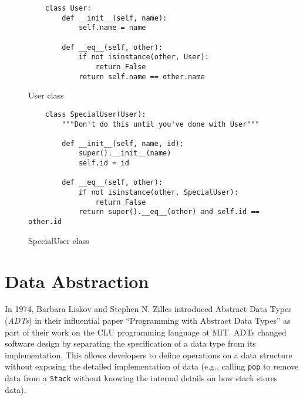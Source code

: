 \documentclass[oneside,11pt,dvipsnames]{book}
\newcommand{\code}[1]{\texttt{#1}}
\begin{document}
    

\begin{figure}
\begin{lstlisting}
    class User:
        def __init__(self, name):
            self.name = name

        def __eq__(self, other):
            if not isinstance(other, User):
                return False
            return self.name == other.name
\end{lstlisting}
\caption{User class}\label{ex:user}
\end{figure}


\begin{figure}
\begin{lstlisting}
    class SpecialUser(User):
        """Don't do this until you've done with User"""

        def __init__(self, name, id):
            super().__init__(name)
            self.id = id

        def __eq__(self, other):
            if not isinstance(other, SpecialUser):
                return False
            return super().__eq__(other) and self.id == other.id
\end{lstlisting}
\caption{SpecialUser class}\label{ex:specialuser}
\end{figure}




\chapter{Data Abstraction}\label{chap:adt}


In 1974, Barbara Liskov and Stephen N. Zilles introduced Abstract Data Types (\emph{ADTs}) in their influential paper ``Programming with Abstract Data Types'' as part of their work on the CLU programming language at MIT. ADTs changed software design by separating the specification of a data type from its implementation. This allows developers to define operations on a data structure without exposing the detailed implementation of data (e.g., calling \code{pop} to remove data from a \code{Stack} without knowing the internal details on how stack stores data). 
\end{document}
